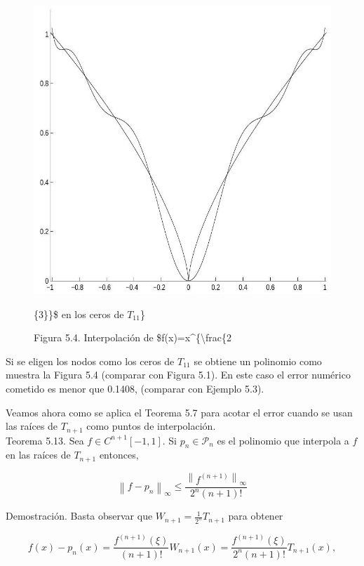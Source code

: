 \documentclass[10pt]{article}
\begin{document}
\begin{figure}[h]
\begin{center}
  \includegraphics[width=\textwidth]{2025_09_05_3888c9ac96bd653d96b4g-104}
\captionsetup{labelformat=empty}
\caption{Figura 5.4. Interpolación de \$f(x)=x\^{}\{\textbackslash frac\{2}\{3\}\}\$ en los ceros de $T_{11}$\}\end{center}
\end{figure}

Si se eligen los nodos como los ceros de $T_{11}$ se obtiene un polinomio como muestra la Figura 5.4 (comparar con Figura 5.1). En este caso el error numérico cometido es menor que 0.1408, (comparar con Ejemplo 5.3).

Veamos ahora como se aplica el Teorema 5.7 para acotar el error cuando se usan las raíces de $T_{n+1}$ como puntos de interpolación.\\
Teorema 5.13. Sea $f \in C^{n+1}[-1,1]$. Si $p_{n} \in \mathcal{P}_{n}$ es el polinomio que interpola a $f$ en las raíces de $T_{n+1}$ entonces,

$$
\left\|f-p_{n}\right\|_{\infty} \leq \frac{\left\|f^{(n+1)}\right\|_{\infty}}{2^{n}(n+1)!}
$$

Demostración. Basta observar que $W_{n+1}=\frac{1}{2^{n}} T_{n+1}$ para obtener

$$
f(x)-p_{n}(x)=\frac{f^{(n+1)}(\xi)}{(n+1)!} W_{n+1}(x)=\frac{f^{(n+1)}(\xi)}{2^{n}(n+1)!} T_{n+1}(x),
$$
\end{document}
